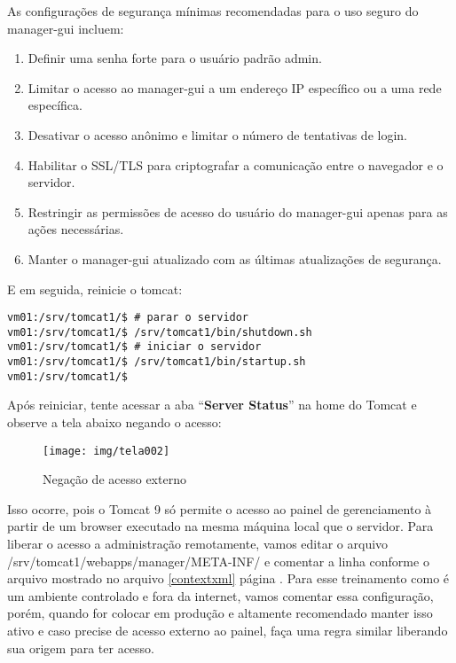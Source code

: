 As configurações de segurança mínimas recomendadas para o uso seguro do manager-gui incluem:

\begin{enumerate}
	\item Definir uma senha forte para o usuário padrão admin.
	\item 	Limitar o acesso ao manager-gui a um endereço IP específico ou a uma rede específica.
	\item 	Desativar o acesso anônimo e limitar o número de tentativas de login.
	\item 	Habilitar o SSL/TLS para criptografar a comunicação entre o navegador e o servidor.
	\item 	Restringir as permissões de acesso do usuário do manager-gui apenas para as ações necessárias.
	\item 	Manter o manager-gui atualizado com as últimas atualizações de segurança.
\end{enumerate}

E em seguida, reinicie o tomcat:

\begin{lstlisting}[breaklines=true,basicstyle=\ttfamily, 
label=restartTomcat,
breaklines=true,caption=\firacoderetina Iniciar e Parar tomcat manualmente,
postbreak=\mbox{\textcolor{red}{$\hookrightarrow$}\space},
showstringspaces=false]
vm01:/srv/tomcat1/$ # parar o servidor	
vm01:/srv/tomcat1/$ /srv/tomcat1/bin/shutdown.sh
vm01:/srv/tomcat1/$ # iniciar o servidor
vm01:/srv/tomcat1/$ /srv/tomcat1/bin/startup.sh
vm01:/srv/tomcat1/$ 
\end{lstlisting}

Após reiniciar, tente acessar a aba “\textbf{Server Status}” na home do Tomcat e observe a tela abaixo negando o acesso:

\begin{figure}[H]
	\centering
	\caption[Negacao de acesso]{Negação de acesso externo}
	\texttt{[image: img/tela002]}
	\label{fig:tomcat-erro-acesso}
\end{figure}

Isso ocorre, pois o Tomcat 9 só permite o acesso ao painel de gerenciamento à partir de um browser executado na mesma máquina local que o servidor. Para liberar o acesso a administração remotamente, vamos editar o arquivo /srv/tomcat1/webapps/manager/META-INF/ e comentar a linha conforme o arquivo mostrado no arquivo \ref{contextxml} página \pageref{contextxml}. Para esse treinamento como é um ambiente controlado e fora da internet, vamos comentar essa configuração, porém, quando for colocar em produção e altamente recomendado manter isso ativo e caso precise de acesso externo ao painel, faça uma regra similar liberando sua origem para ter acesso.

